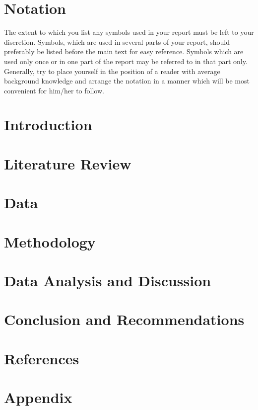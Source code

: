 \documentclass[a4paper,11, oneside]{article}
\begin{document}
\section*{Notation}
The extent to which you list any symbols used in your report must be left to your discretion. Symbols, which are used in several parts of your report, should preferably be listed before the main text for easy reference. Symbols which are used only once or in one part of the report may be referred to in that part only. Generally, try to place yourself in the position of a reader with average background knowledge and arrange the notation in a manner which will be most convenient for him/her to follow.
\pagebreak

\tableofcontents
\pagebreak
\listoffigures
\listoftables
\pagebreak
\newpage


\cleardoublepage{}

\section{Introduction}

\pagebreak

\section{Literature Review}

\pagebreak

\section{Data}

\pagebreak

\section{Methodology}

\pagebreak


\section{Data Analysis and Discussion}

\pagebreak

\section{Conclusion and Recommendations}

\pagebreak

\section{References}

\pagebreak


\section{Appendix}

\end{document}
